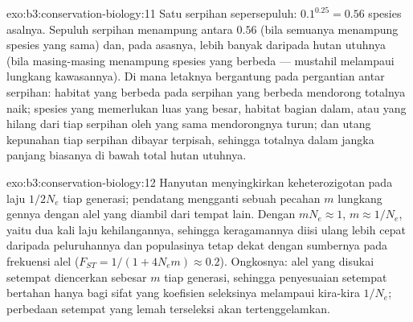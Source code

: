 \begin{solution}{exo:b3:conservation-biology:11}
Satu serpihan sepersepuluh: $0.1^{0.25} = 0.56$ spesies asalnya. Sepuluh
serpihan menampung antara $0.56$ (bila semuanya menampung spesies yang
sama) dan, pada asasnya, lebih banyak daripada hutan utuhnya (bila
masing-masing menampung spesies yang berbeda --- mustahil melampaui
lungkang kawasannya). Di mana letaknya bergantung pada pergantian antar
serpihan: habitat yang berbeda pada serpihan yang berbeda mendorong
totalnya naik; spesies yang memerlukan luas yang besar, habitat bagian
dalam, atau yang hilang dari tiap serpihan oleh  yang sama
mendorongnya turun; dan utang kepunahan tiap serpihan dibayar terpisah,
sehingga totalnya dalam jangka panjang biasanya di bawah total hutan utuhnya.
\end{solution}

\begin{solution}{exo:b3:conservation-biology:12}
Hanyutan menyingkirkan keheterozigotan pada laju $1/2N_{e}$ tiap
generasi; pendatang mengganti sebuah pecahan $m$ lungkang gennya dengan
alel yang diambil dari tempat lain. Dengan $mN_{e} \approx 1$, $m \approx 1/N_{e}$, yaitu dua kali
laju kehilangannya, sehingga keragamannya diisi ulang lebih cepat daripada
peluruhannya dan populasinya tetap dekat dengan sumbernya pada frekuensi
alel ($F_{ST} = 1/(1
+ 4N_{e}m) \approx 0.2$). Ongkosnya: alel yang disukai setempat diencerkan
sebesar $m$ tiap generasi, sehingga penyesuaian setempat bertahan hanya
bagi sifat yang koefisien seleksinya melampaui kira-kira $1/N_{e}$;
perbedaan setempat yang lemah terseleksi akan tertenggelamkan.
\end{solution}

